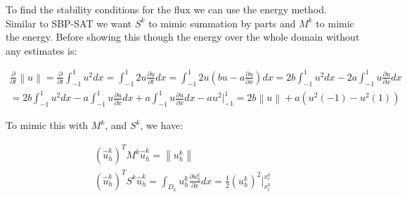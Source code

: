 \documentclass{article}
\newcommand{\norm}[1]{\left\lVert#1\right\rVert}
\begin{document}
To find the stability conditions for the flux we can use the energy method. Similar to SBP-SAT we want $S^k$ to mimic summation by parts and $M^k$ to mimic the energy. Before showing this though the energy over the whole domain without any estimates is:

\begin{gather*}
  \frac{\partial}{\partial t} \norm{u} =  \frac{\partial}{\partial t} \int_{-1}^1 u^2 dx = \int_{-1}^1 2u\frac{\partial u}{\partial t} dx = \int_{-1}^1 2u\left(bu-a\frac{\partial u}{\partial x}\right) dx = 2b\int_{-1}^1 u^2 dx - 2a\int_{-1}^1 u\frac{\partial u }{\partial x} dx \\
  =  2b\int_{-1}^1 u^2 dx - a\int_{-1}^1 u\frac{\partial u }{\partial x} dx + a\int_{-1}^1 u\frac{\partial u }{\partial x} dx - au^2\biggr\rvert_{-1}^1 = 2b\norm{u} + a(u^2(-1) - u^2(1))
\end{gather*}

To mimic this with $M^k$, and $S^k$, we have:

\begin{gather*}
  (\hat{u}_h^k)^T M^k \hat{u}_h^k = \norm{u_h^k} \\
  (\hat{u}_h^k)^T S^k \hat{u}_h^k = \int_{D_k} u_h^k\frac{\partial u_h^k}{\partial x} dx = \frac{1}{2} (u_h^k)^2\biggr\rvert_{x_l^k}^{x^k_r}
\end{gather*}
\end{document}

